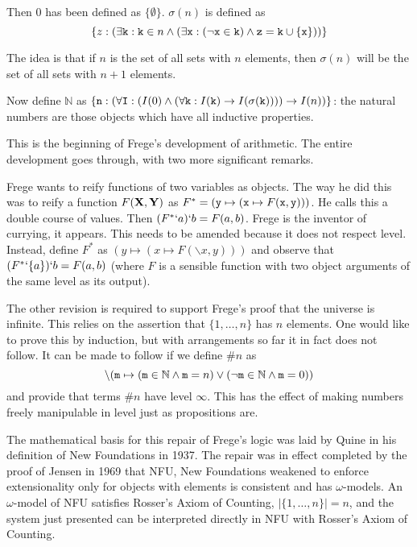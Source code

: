 \documentclass[12pt]{article}
\begin{document}
Then 0 has been defined as $\{\emptyset\}$.  $\sigma(n)$ is defined as $$\{z : (\exists {\tt k}:{\tt k} \in n \wedge (\exists {\tt x}: (\neg {\tt x} \in {\tt k}) \wedge {\tt z} = {\tt k} \cup \{{\tt x}\}))\}$$

The idea is that if $n$ is the set of all sets with $n$ elements, then $\sigma(n)$ will be the set of all sets with $n+1$ elements.

Now define $\mathbb N$ as $\{{\tt n}:(\forall {\tt I}:(I(0) \wedge (\forall {\tt k}:I({\tt k}) \rightarrow I(\sigma({\tt k}))))\rightarrow I(n))\}$:  the natural numbers are those objects which have all inductive properties.

This is the beginning of Frege's development of arithmetic. The entire development goes through, with two more significant remarks.

Frege wants to reify functions of two variables as objects.  The way he did this was to reify a function $F({\bf X},{\bf Y})$ as $F^* =({\tt y} \mapsto ({\tt x} \mapsto F({\tt x},{\tt y})))$.  He calls this a double course of values.  Then $(F^*`a)`b = F(a,b)$.  Frege is the inventor of currying, it appears.  This needs to be amended because it does not respect level.
  Instead, define $F^*$ as $(y \mapsto(x \mapsto F(\backslash x,y)))$ and observe that $(F^*`\{a\})`b = F(a,b)$ (where $F$ is a sensible function with two object arguments of the same level as its output).

The other revision is required to support Frege's proof that the universe is infinite.  This relies on the assertion that $\{1,\ldots,n\}$ has $n$ elements.  One would like to prove this by induction, but with arrangements so far it in fact does not follow.  It can be made to follow if we define $\#n$ as $$\backslash({\tt m} \mapsto ({\tt m} \in {\mathbb N} \wedge {\tt m}=n) \vee (\neg{\tt m} \in {\mathbb N} \wedge {\tt m}=0))$$  and provide that
terms $\#n$ have level $\infty$.  This has the effect of making numbers freely manipulable in level just as propositions are.

The mathematical basis for this repair of Frege's logic was laid by Quine in his definition of New Foundations in 1937.  The repair was in effect completed by the proof of Jensen in 1969 that NFU, New Foundations weakened to enforce extensionality only for objects with elements is consistent and has $\omega$-models.  An $\omega$-model of NFU satisfies Rosser's Axiom of Counting, $|\{1,\ldots,n\}| = n$, and the system just
presented can be interpreted directly in NFU with Rosser's Axiom of Counting.
\end{document}
